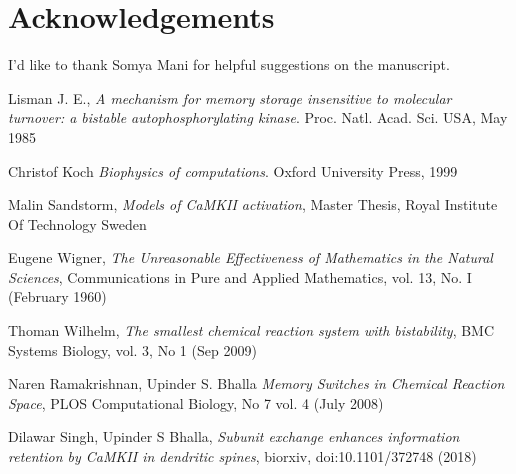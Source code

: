 \documentclass[]{resonance}
\begin{document}
\section*{Acknowledgements}
I'd like to thank Somya Mani for helpful suggestions on the manuscript.


\begin{thebibliography}{99} 
    Lisman J. E., 
    \textit{A mechanism for memory storage insensitive to molecular turnover: a
    bistable autophosphorylating kinase}. 
    Proc. Natl. Acad. Sci. USA, May 1985

    Christof Koch
    \textit{Biophysics of computations}.
    Oxford University Press, 1999

    Malin Sandstorm,
    \textit{Models of CaMKII activation},
    Master Thesis, Royal Institute Of Technology Sweden 

    Eugene Wigner,
    \textit{The Unreasonable Effectiveness of Mathematics in the Natural Sciences},
     Communications in Pure and Applied Mathematics, vol. 13, No. I (February 1960)

    Thoman Wilhelm,
    \textit{The smallest chemical reaction system with bistability},
    BMC Systems Biology, vol. 3, No 1 (Sep 2009)

    Naren Ramakrishnan, Upinder S. Bhalla
    \textit{Memory Switches in Chemical Reaction Space},
    PLOS Computational Biology, No 7 vol. 4 (July 2008)

    Dilawar Singh, Upinder S Bhalla,
    \textit{Subunit exchange enhances information retention by CaMKII in dendritic spines},
    biorxiv, doi:10.1101/372748 (2018)

\end{thebibliography}
\end{document}
